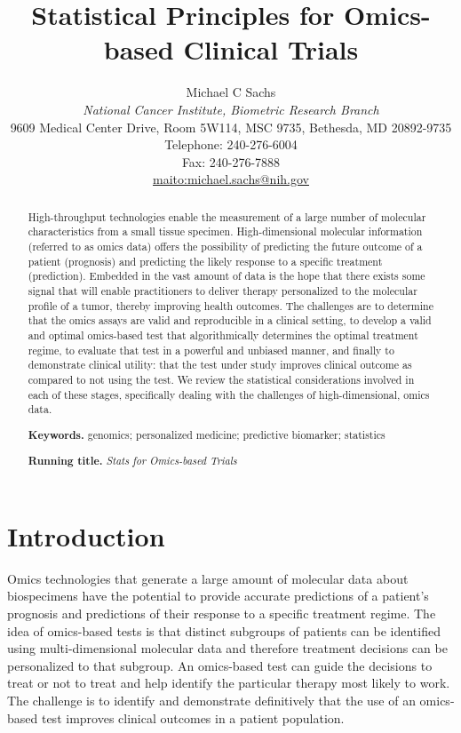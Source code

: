 \documentclass[11pt]{article}
\title{\bigskip \bigskip Statistical Principles for Omics-based Clinical Trials}
\author{\Large Michael C Sachs\vspace{0.05in} \\ \normalsize\emph{National Cancer Institute, Biometric Research Branch} \\ 
\footnotesize 9609 Medical Center Drive, Room 5W114, MSC 9735, Bethesda, MD 20892-9735 \\
\footnotesize Telephone: 240-276-6004 \\
\footnotesize Fax: 240-276-7888 \\
 \url{maito:michael.sachs@nih.gov}\vspace*{0.2in}\\ }
\begin{document}
  
		




\maketitle


\begin{abstract}

\noindent High-throughput technologies enable the measurement of a large number of
molecular characteristics from a small tissue specimen. High-dimensional
molecular information (referred to as omics data) offers the possibility
of predicting the future outcome of a patient (prognosis) and predicting
the likely response to a specific treatment (prediction). Embedded in
the vast amount of data is the hope that there exists some signal that
will enable practitioners to deliver therapy personalized to the
molecular profile of a tumor, thereby improving health outcomes. The
challenges are to determine that the omics assays are valid and
reproducible in a clinical setting, to develop a valid and optimal
omics-based test that algorithmically determines the optimal treatment
regime, to evaluate that test in a powerful and unbiased manner, and
finally to demonstrate clinical utility: that the test under study
improves clinical outcome as compared to not using the test. We review
the statistical considerations involved in each of these stages,
specifically dealing with the challenges of high-dimensional, omics
data.

\smallskip
\noindent \textbf{Keywords.} genomics; personalized medicine; predictive biomarker; statistics

\smallskip
\noindent \textbf{Running title.} \textit{Stats for Omics-based Trials}

\end{abstract}


\section{Introduction}\label{introduction}

Omics technologies that generate a large amount of molecular data about
biospecimens have the potential to provide accurate predictions of a
patient's prognosis and predictions of their response to a specific
treatment regime. The idea of omics-based tests is that distinct
subgroups of patients can be identified using multi-dimensional
molecular data and therefore treatment decisions can be personalized to
that subgroup. An omics-based test can guide the decisions to treat or
not to treat and help identify the particular therapy most likely to
work. The challenge is to identify and demonstrate definitively that the
use of an omics-based test improves clinical outcomes in a patient
population.
\end{document}
